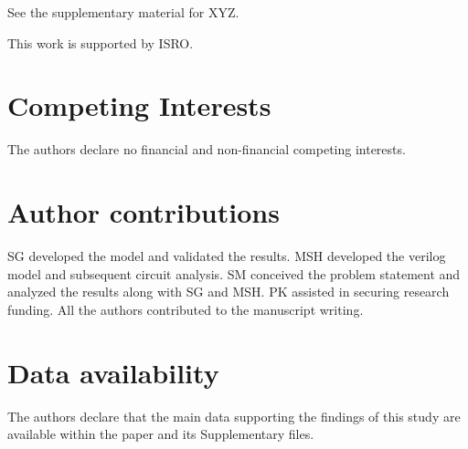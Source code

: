 \documentclass[aip,apl,reprint,floatfix]{revtex4-2}
\begin{document}
See the supplementary material for XYZ.

\begin{acknowledgments}
This work is supported by ISRO.
\end{acknowledgments}

\section{Competing Interests}\label{note}

The authors declare no financial and non-financial competing interests.

\section{Author contributions}\label{contribution}

SG developed the model and validated the results. MSH developed the verilog model and subsequent circuit analysis. SM conceived the problem statement and analyzed the results along with SG and MSH. PK assisted in securing research funding. All the authors contributed to the manuscript writing.

\section{Data availability}\label{Data}

The authors declare that the main data supporting the findings of this study are available within the paper and its Supplementary files. 




%
\nocite{aip41Control}


\end{document}
